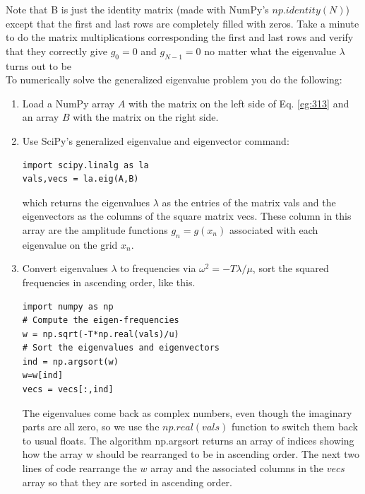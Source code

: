 \documentclass{book}
\theoremstyle{plain}
\theoremstyle{definition}
\numberwithin{exm}{chapter}
\theoremstyle{remark}
\theoremstyle{summary}
\theoremstyle{overview}
\begin{document}
Note that B is just the identity matrix (made with NumPy\rq s $np.identity(N)$)
except that the first and last rows are completely filled with zeros. Take a minute
to do the matrix multiplications corresponding the first and last rows and verify
that they correctly give $g_0 = 0$ and $g_{N−1} = 0$ no matter what the eigenvalue $\lambda$ turns
out to be \\ 
	To numerically solve the generalized eigenvalue problem you do the following:
	\begin{enumerate}
		\item Load a NumPy array $A$ with the matrix on the left side of Eq. \eqref{eg:313} and an
array $B$ with the matrix on the right side.
\item Use SciPy\rq s generalized eigenvalue and eigenvector command:
\begin{lstlisting}
import scipy.linalg as la
vals,vecs = la.eig(A,B)
\end{lstlisting}
which returns the eigenvalues $\lambda$ as the entries of the matrix vals and the
eigenvectors as the columns of the square matrix vecs. These column
in this array are the amplitude functions $g_n = g(x_n)$ associated with each
eigenvalue on the grid $x_n$.
\item Convert eigenvalues $\lambda$ to frequencies via $\omega^2 = −T \lambda/\mu$, sort the squared
frequencies in ascending order, like this.
\begin{lstlisting}
import numpy as np
# Compute the eigen-frequencies
w = np.sqrt(-T*np.real(vals)/u)
# Sort the eigenvalues and eigenvectors
ind = np.argsort(w)
w=w[ind]
vecs = vecs[:,ind]
\end{lstlisting}
The eigenvalues come back as complex numbers, even though the imaginary parts are all zero, so we use the $np.real(vals)$ function to switch
them back to usual floats. The algorithm np.argsort returns an array of
indices showing how the array w should be rearranged to be in ascending
order. The next two lines of code rearrange the $w$ array and the associated
columns in the $vecs$ array so that they are sorted in ascending order.


	\end{enumerate}
	
\end{document}
